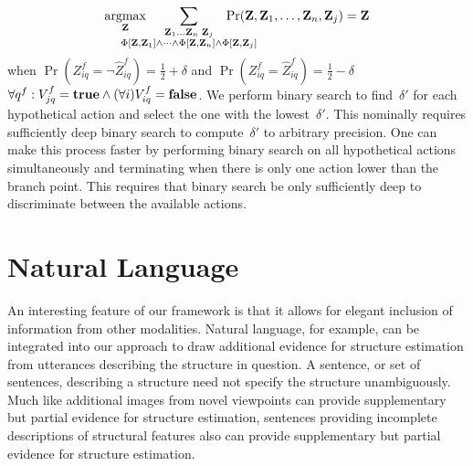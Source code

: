 \par\vspace*{-2ex}
\begin{equation*}
  \argmax_{\mathbf{Z}}\hspace{-5ex}
  \sum_{\substack{\mathbf{Z}_1\ldots\mathbf{Z}_n\;\mathbf{Z}_j\\
      \Phi[\mathbf{Z},\mathbf{Z}_1]\wedge\cdots\wedge\Phi[\mathbf{Z},\mathbf{Z}_n]
      \wedge\Phi[\mathbf{Z},\mathbf{Z}_j]}}\hspace{-6ex}
  \Pr(\mathbf{Z},\mathbf{Z}_1,\ldots,\mathbf{Z}_n,\mathbf{Z}_j)=\mathbf{Z}
  \vspace*{-0.5ex}
\end{equation*}
when
\begin{math}
    \Pr(Z^f_{iq}=\neg\hat{Z}^f_{iq})=\frac{1}{2}+\delta
\end{math}
and
\begin{math}
    \Pr(Z^f_{iq}=\hat{Z}^f_{iq})=\frac{1}{2}-\delta
\end{math}
$\forall q^f:V^f_{jq}=\mathbf{true}\wedge(\forall i)V^f_{iq}=\mathbf{false}$.
%
We perform binary search to find~$\delta'$ for each hypothetical action
and select the one with the lowest~$\delta'$.
%
This nominally requires sufficiently deep binary search to compute~$\delta'$ to
arbitrary precision.
%
One can make this process faster by performing binary search on all
hypothetical actions simultaneously and terminating when there is only one
action lower than the branch point.
%
This requires that binary search be only sufficiently deep to discriminate
between the available actions.

\par\vspace{-1ex}
\section{Natural Language}
\label{sec:language}

An interesting feature of our framework is that it allows for elegant inclusion
of information from other modalities.
%
Natural language, for example, can be integrated into our approach to draw
additional evidence for structure estimation from utterances describing the
structure in question.
%
A sentence, or set of sentences, describing a structure need not specify the
structure unambiguously.
%
Much like additional images from novel viewpoints can provide supplementary but
partial evidence for structure estimation, sentences providing incomplete
descriptions of structural features also can provide supplementary but partial
evidence for structure estimation.

